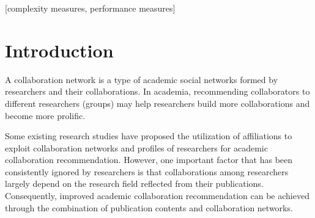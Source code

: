 \documentclass{acm_proc_article-sp}
\begin{document}
\date{30 July 1999}

\maketitle
\begin{abstract}
Due to the expansion of academic research in diverse fields, the problem of finding relevant and potential collaborators has become cumbersome. In this work, we propose an academic collaboration recommendation model called CCRec. CCRec combines publication contents with collaboration networks to effectively generate academic collaboration recommendation for researchers. Using the DBLP data sets, we conduct benchmarking experiments to examine the performance of CCRec. Our preliminary experimental results show that CCRec outperforms other state-of-the-art methods especially in addressing the topic drift problems.
\end{abstract}

[complexity measures, performance measures]



\section{Introduction}
A collaboration network is a type of academic social networks formed by researchers and their collaborations. In academia, recommending collaborators to different researchers (groups) may help researchers build more collaborations and become more prolific.

Some existing research studies \cite{benchettara2010supervised} \cite{brandao2012affiliation} \cite{brandao2013using} have proposed the utilization of affiliations to exploit collaboration networks and profiles of researchers for academic collaboration recommendation. However, one important factor that has been consistently ignored by researchers is that collaborations among researchers largely depend on the research field reflected from their publications. Consequently, improved academic collaboration recommendation can be achieved through the combination of publication contents and collaboration networks.
\end{document}
